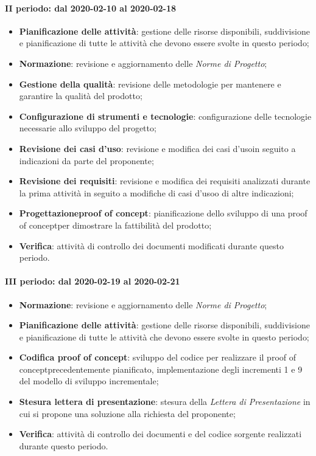 \paragraph*{II periodo: dal 2020-02-10 al 2020-02-18}
\begin{itemize}
	\item \textbf{Pianificazione delle attività}: gestione delle risorse disponibili, suddivisione e pianificazione di tutte le attività che devono essere svolte in questo periodo;
	\item \textbf{Normazione}: revisione e aggiornamento delle \textit{Norme di Progetto};
	\item \textbf{Gestione della qualità}: revisione delle metodologie per mantenere e garantire la qualità del prodotto\glo;
	\item \textbf{Configurazione di strumenti e tecnologie}: configurazione delle tecnologie necessarie allo sviluppo del progetto\glo;
	\item \textbf{Revisione dei casi d'uso}\glo: revisione e modifica dei casi d'uso\glosp in seguito a indicazioni da parte del proponente;
	\item \textbf{Revisione dei requisiti}: revisione e modifica dei requisiti analizzati durante la prima attività in seguito a modifiche di casi d'uso\glosp o di altre indicazioni;
	\item \textbf{Progettazione}\glosp\textbf{proof of concept}\glo: pianificazione dello sviluppo di una proof of concept\glosp per dimostrare la fattibilità del prodotto\glo;
	\item \textbf{Verifica}: attività di controllo dei documenti modificati durante questo periodo.
\end{itemize}

\paragraph*{III periodo: dal 2020-02-19 al 2020-02-21}
\begin{itemize}
	\item \textbf{Normazione}: revisione e aggiornamento delle \textit{Norme di Progetto};
	\item \textbf{Pianificazione delle attività}: gestione delle risorse disponibili, suddivisione e pianificazione di tutte le attività che devono essere svolte in questo periodo;
	\item \textbf{Codifica proof of concept}\glo: sviluppo del codice per realizzare il proof of concept\glosp precedentemente pianificato, implementazione degli incrementi 1 e 9 del modello di sviluppo incrementale;
	\item \textbf{Stesura lettera di presentazione}: stesura della \textit{Lettera di Presentazione} in cui si propone una soluzione alla richiesta del proponente;
	\item \textbf{Verifica}: attività di controllo dei documenti e del codice sorgente realizzati durante questo periodo.
\end{itemize}

